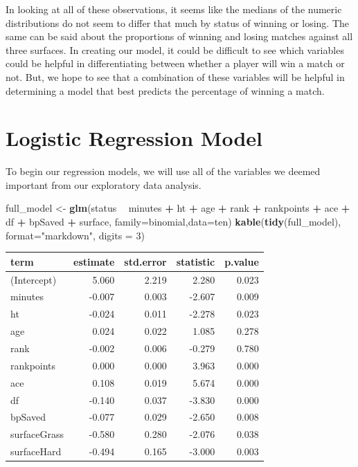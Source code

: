 \documentclass[]{article}
\newenvironment{Shaded}{\begin{snugshade}}{\end{snugshade}}
\newcommand{\DataTypeTok}[1]{\textcolor[rgb]{0.13,0.29,0.53}{#1}}
\newcommand{\DecValTok}[1]{\textcolor[rgb]{0.00,0.00,0.81}{#1}}
\newcommand{\KeywordTok}[1]{\textcolor[rgb]{0.13,0.29,0.53}{\textbf{#1}}}
\newcommand{\NormalTok}[1]{#1}
\newcommand{\OperatorTok}[1]{\textcolor[rgb]{0.81,0.36,0.00}{\textbf{#1}}}
\newcommand{\StringTok}[1]{\textcolor[rgb]{0.31,0.60,0.02}{#1}}
\begin{document}
In looking at all of these observations, it seems like the medians of
the numeric distributions do not seem to differ that much by status of
winning or losing. The same can be said about the proportions of winning
and losing matches against all three surfaces. In creating our model, it
could be difficult to see which variables could be helpful in
differentiating between whether a player will win a match or not. But,
we hope to see that a combination of these variables will be helpful in
determining a model that best predicts the percentage of winning a
match.

\hypertarget{logistic-regression-model}{%
\section{Logistic Regression Model}\label{logistic-regression-model}}

To begin our regression models, we will use all of the variables we
deemed important from our exploratory data analysis.

\begin{Shaded}
\begin{Highlighting}[]
\NormalTok{full_model <-}\StringTok{ }\KeywordTok{glm}\NormalTok{(status }\OperatorTok{~}\StringTok{ }\NormalTok{minutes }\OperatorTok{+}\StringTok{ }\NormalTok{ht }\OperatorTok{+}\StringTok{ }\NormalTok{age }\OperatorTok{+}\StringTok{ }\NormalTok{rank }\OperatorTok{+}\StringTok{ }
\StringTok{                }\NormalTok{rankpoints }\OperatorTok{+}\StringTok{ }\NormalTok{ace }\OperatorTok{+}\StringTok{ }\NormalTok{df }\OperatorTok{+}\StringTok{ }\NormalTok{bpSaved }\OperatorTok{+}\StringTok{ }\NormalTok{surface, }
                \DataTypeTok{family=}\NormalTok{binomial,}\DataTypeTok{data=}\NormalTok{ten)}
\KeywordTok{kable}\NormalTok{(}\KeywordTok{tidy}\NormalTok{(full_model), }\DataTypeTok{format=}\StringTok{"markdown"}\NormalTok{, }\DataTypeTok{digits =} \DecValTok{3}\NormalTok{)}
\end{Highlighting}
\end{Shaded}

\begin{longtable}[]{@{}lrrrr@{}}
\toprule
term & estimate & std.error & statistic & p.value\tabularnewline
\midrule
\endhead
(Intercept) & 5.060 & 2.219 & 2.280 & 0.023\tabularnewline
minutes & -0.007 & 0.003 & -2.607 & 0.009\tabularnewline
ht & -0.024 & 0.011 & -2.278 & 0.023\tabularnewline
age & 0.024 & 0.022 & 1.085 & 0.278\tabularnewline
rank & -0.002 & 0.006 & -0.279 & 0.780\tabularnewline
rankpoints & 0.000 & 0.000 & 3.963 & 0.000\tabularnewline
ace & 0.108 & 0.019 & 5.674 & 0.000\tabularnewline
df & -0.140 & 0.037 & -3.830 & 0.000\tabularnewline
bpSaved & -0.077 & 0.029 & -2.650 & 0.008\tabularnewline
surfaceGrass & -0.580 & 0.280 & -2.076 & 0.038\tabularnewline
surfaceHard & -0.494 & 0.165 & -3.000 & 0.003\tabularnewline
\bottomrule
\end{longtable}
\end{document}

